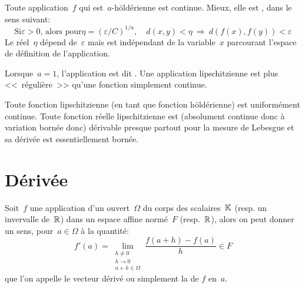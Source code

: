 \medskip
\begin{theoreme}
Toute application~$f$ qui est~$a$-höldérienne est continue. Mieux, elle est
, dans le sens suivant:
\begin{equation}
\text{Si} \varepsilon>0\text{, alors pour} \eta = \left( \varepsilon / C \right)^{1 / a},\quad d\left( x, y \right) < \eta \ \Rightarrow\ d\left( f(x), f(y) \right) < \varepsilon
\end{equation}
Le réel~$\eta$ dépend de~$\varepsilon$ mais est indépendant de la variable~$x$
parcourant l'espace de définition de l'application.
\end{theoreme}
\begin{definition}
Lorsque~$a = 1$, l'application est dit .
Une application lipschitzienne est plus <<~régulière~>> qu'une fonction
simplement continue.
\end{definition}
\medskip
Toute fonction lipschitzienne (en tant que fonction höldérienne) est uniformément continue.
\medskip
Toute fonction réelle lipschitzienne est (absolument continue donc à variation bornée donc)
dérivable presque partout pour la mesure de Lebesgue et sa dérivée est essentiellement bornée.
\medskip
\section{Dérivée}
\medskip
\begin{definition}
Soit~$f$ une application d'un ouvert~$\Omega$ du corps des scalaires~$\mathbb K$ (resp. un invervalle
de~$\mathbb R$) dans un espace affine normé~$F$ (resp.~$\mathbb R$), alors on peut donner un sens,
pour~$a\in\Omega$ à la quantité:
\begin{equation}
f'(a)=\lim_{\substack{h\ne0\\h\to0\\a+h\in\Omega}} \dfrac{f(a+h)-f(a)}h \in F
\end{equation}
que l'on appelle le vecteur dérivé ou simplement la  de
$f$ en~$a$.
\end{definition}

